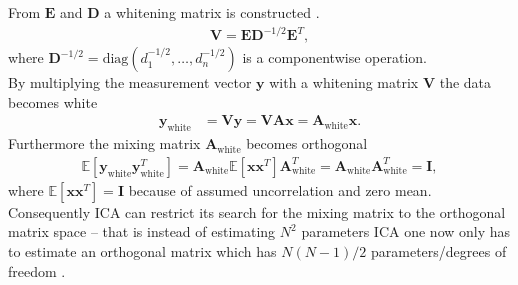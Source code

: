 From $\mathbf{E}$ and $\mathbf{D}$ a whitening matrix is constructed \cite[p.159]{ICA}.
\begin{align*}
\mathbf{V} = \mathbf{ED}^{-1/2} \mathbf{E}^T,
\end{align*}
where $\mathbf{D}^{-1/2} = \text{diag}(d_1^{-1/2},\dots, d_n^{-1/2})$ is a componentwise operation.
\\  
By multiplying the measurement vector $\mathbf{y}$ with a whitening matrix $\mathbf{V}$ the data becomes white
\begin{align}
\mathbf{y}_{\text{white}} &= \mathbf{Vy} = \mathbf{VAx} = \mathbf{A}_{\text{white}} \mathbf{x}. \nonumber
\end{align}
Furthermore the mixing matrix $\mathbf{A}_{\text{white}}$ becomes orthogonal 
\begin{align*}
 \mathbb{E}[\mathbf{y}_{\text{white}} \mathbf{y}_{\text{white}}^T] = \mathbf{A}_{\text{white}} \mathbb{E}[\mathbf{xx}^T] \mathbf{A}_{\text{white}}^T = \mathbf{A}_{\text{white}} \mathbf{A}_{\text{white}}^T = \mathbf{I},
 \end{align*} 
where $\mathbb{E}[\mathbf{xx}^T] = \mathbf{I}$ because of assumed uncorrelation and zero mean. Consequently ICA can restrict its search for the mixing matrix to the orthogonal matrix space -- that is instead of estimating $N^2$ parameters ICA one now only has to estimate an orthogonal matrix which has $N(N-1)/2$ parameters/degrees of freedom \cite[p. 159]{ICA}
.

